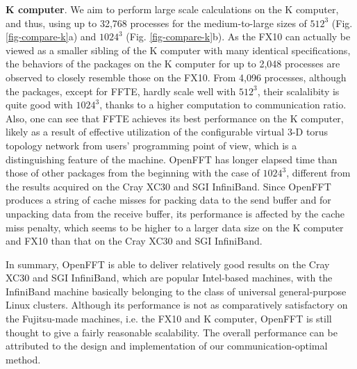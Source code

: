 \begin{itemize}
\textbf{K computer}. We aim to perform large scale calculations on the K computer, and thus, using up to 32,768 processes for the medium-to-large sizes of $512^3$ (Fig. \ref{fig-compare-k}a) and $1024^3$ (Fig. \ref{fig-compare-k}b). As the FX10 can actually be viewed as a smaller sibling of the K computer with many identical specifications, the behaviors of the packages on the K computer for up to 2,048 processes are observed to closely resemble those on the FX10. From 4,096 processes, although the packages, except for FFTE, hardly scale well with $512^3$, their scalalibity is quite good with $1024^3$, thanks to a higher computation to communication ratio. Also, one can see that FFTE achieves its best performance on the K computer, likely as a result of effective utilization of the configurable virtual 3-D torus topology network from users' programming point of view, which is a distinguishing feature of the machine. OpenFFT has longer elapsed time than those of other packages from the beginning with the case of $1024^3$, different from the results acquired on the Cray XC30 and SGI InfiniBand. Since OpenFFT produces a string of cache misses for packing data to the send buffer and for unpacking data from the receive buffer, its performance is affected by the cache miss penalty, which seems to be higher to a larger data size on the K computer and FX10 than that on the Cray XC30 and SGI InfiniBand. 
\end{itemize}

In summary, OpenFFT is able to deliver relatively good results on the Cray XC30 and SGI InfiniBand, which are popular Intel-based machines, with the InfiniBand machine basically belonging to the class of universal general-purpose Linux clusters. Although its performance is not as comparatively satisfactory on the Fujitsu-made machines, i.e. the FX10 and K computer, OpenFFT is still thought to give a fairly reasonable scalability. The overall performance can be attributed to the design and implementation of our communication-optimal method. 

